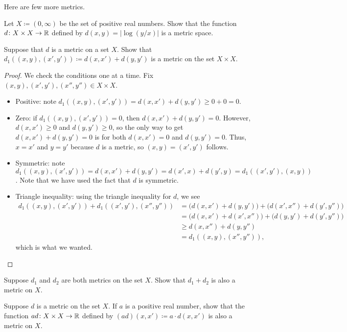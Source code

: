 \documentclass[../main.tex]{subfiles}
\begin{document}
Here are few more metrics.
\begin{exercise}
    Let $X\coloneqq(0,\infty)$ be the set of positive real numbers. Show that the function $d\colon X\times X\to\mathbb R$ defined by $d(x, y) = |\log(y/x)|$ is a metric space.
\end{exercise}
\begin{example} \label{exe:general-taxi-metric}
    Suppose that $d$ is a metric on a set $X$. Show that $d_1((x,y),(x',y'))\coloneqq d(x,x')+d(y,y')$ is a metric on the set $X\times X$.
\end{example}
\begin{proof}
    We check the conditions one at a time. Fix $(x,y),(x',y'),(x'',y'')\in X\times X$.
    \begin{itemize}
        \item Positive: note $d_1((x,y),(x',y'))=d(x,x')+d(y,y')\ge0+0=0$.
        \item Zero: if $d_1((x,y),(x',y'))=0$, then $d(x,x')+d(y,y')=0$. However, $d(x,x')\ge0$ and $d(y,y')\ge0$, so the only way to get $d(x,x')+d(y,y')=0$ is for both $d(x,x')=0$ and $d(y,y')=0$. Thus, $x=x'$ and $y=y'$ because $d$ is a metric, so $(x,y)=(x',y')$ follows.
        \item Symmetric: note $d_1((x,y),(x',y'))=d(x,x')+d(y,y')=d(x',x)+d(y',y)=d_1((x',y'),(x,y))$. Note that we have used the fact that $d$ is symmetric.
        \item Triangle inequality: using the triangle inequality for $d$, we see
        \begin{align*}
            d_1((x,y),(x',y'))+d_1((x',y'),(x'',y'')) &= \big(d(x,x')+d(y,y')\big)+\big(d(x',x'')+d(y',y'')\big) \\
            &= \big(d(x,x')+d(x',x'')\big)+\big(d(y,y')+d(y',y'')\big) \\
            &\ge d(x,x'')+d(y,y'') \\
            &= d_1((x,y),(x'',y'')),
        \end{align*}
        which is what we wanted.
        \qedhere
    \end{itemize}
\end{proof}
\begin{exercise}
    Suppose $d_1$ and $d_2$ are both metrics on the set $X$. Show that $d_1+d_2$ is also a metric on $X$.
\end{exercise}
\begin{exercise}
    Suppose $d$ is a metric on the set $X$. If $a$ is a positive real number, show that the function $ad\colon X\times X\to\mathbb R$ defined by $(ad)(x,x')\coloneqq a\cdot d(x,x')$ is also a metric on $X$.
\end{exercise}
\end{document}
